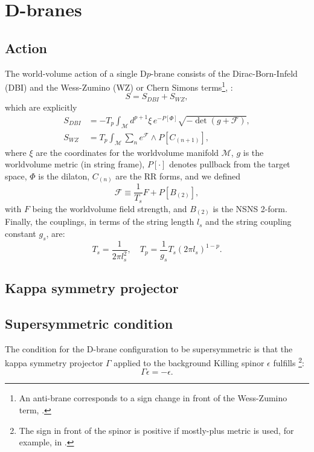 \section{D-branes}\label{sec:Dbranes}

\subsection{Action}
The world-volume action of a single D$p$-brane consists of the Dirac-Born-Infeld (DBI) and the Wess-Zumino (WZ) or Chern Simons terms\footnote{An anti-brane corresponds to a sign change in front of the Wess-Zumino term, \cite{Kruczenski:2003be}.},
\cite{Ammon:2015wua}:
\begin{equation}
 S = S_{DBI} + S_{WZ},
\end{equation}
which are explicitly
\begin{align}
 S_{DBI} & = 
 -T_p \int_\mathcal{M} d^{p+1}\xi \, e^{-P[\Phi] } \sqrt{-\det (g+\mathcal{F})},\\
 S_{WZ} & =
 T_p\int _\mathcal{M} \sum_n e^{\mathcal{F}}\wedge P[C_{(n+1)}],
\end{align}
where $\xi$ are the coordinates for the worldvolume manifold $\mathcal{M}$, $g$ is the worldvolume metric (in string frame), $P[\cdot]$ denotes pullback from the target space, $\Phi$ is the dilaton, $C_{(n)}$ are the RR forms, and we defined
\begin{equation}
 \mathcal{F} \equiv \frac{1}{T_s} F + P[B_{(2)}], 
\end{equation}
with $F$ being the worldvolume field strength, and $B_{(2)}$ is the NSNS 2-form. Finally, the couplings, in terms of the string length $l_s$ and the string coupling constant $g_s$, are:
\begin{equation}
 T_{s} = \dfrac{1}{2\pi l_s^2}, \quad T_p = \dfrac{1}{g_s} T_s (2\pi l_s)^{1-p}.
\end{equation}


\subsection{Kappa symmetry projector}



\subsection{Supersymmetric condition}
The condition for the D-brane configuration to be supersymmetric is that the kappa symmetry projector $\Gamma$ applied to the background Killing spinor $\epsilon$ fulfills
\footnote{The sign in front of the spinor is positive if mostly-plus metric is used, for example, in \cite{Skenderis:2002vf}.}:
\begin{equation} \label{eq:susyCondition}
 \Gamma \epsilon = - \epsilon.
\end{equation}

